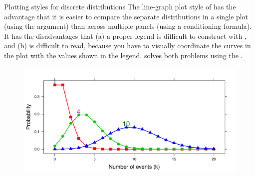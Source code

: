 \documentclass[11pt]{book}
\renewenvironment{knitrout}{\small\renewcommand{\baselinestretch}{.85}}{} %
\begin{document}
\begin{Example}{Plotting styles for discrete distributions}
The line-graph plot style of  has the advantage that
it is easier to compare the separate distributions in a single plot 
(using the  argument) than
across multiple panels (using a conditioning formula). 
It has the disadvantages that (a) a proper legend is
difficult to construct with , and (b) is difficult to read, because
you have to visually coordinate the curves in the plot with the values shown
in the legend.   solves both problems using
the .
\begin{knitrout}
\color{fgcolor}\begin{kframe}
\begin{alltt}
 \hlkwb{<-} \hlstd{()[}\hlopt{:}\hlstd{]}
 \hlkwb{<-}  \hlopt{~}   
  \hlstd{=}\hlstd{,} \hlstd{=}\hlopt{:}\hlstd{,} \hlstd{=}\hlstd{,} \hlstd{=}\hlstd{,} 
  \hlstd{=}\hlstd{(}\hlstd{,} \hlstd{=}\hlstd{),}
        \hlstd{=}\hlstd{(}\hlstd{,}  \hlstd{=}\hlstd{))}

 \hlstd{(}\hlstd{,} \hlstd{=}\hlstd{,} \hlstd{(}\hlopt{+}\hlstd{)))}
\end{alltt}
\end{kframe}\begin{figure}[!htbp]


\centerline{\includegraphics[width=.8\textwidth]{ch03/fig/dpois-xyplot2} }


\end{figure}
\end{knitrout}
\end{Example}
\end{document}
